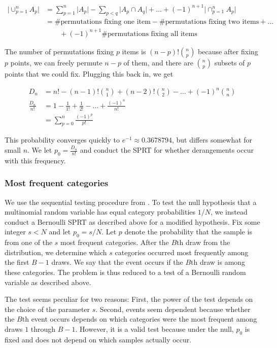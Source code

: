 \documentclass[12pt]{article}
\begin{document}
\begin{align*}
\lvert \cup_{p=1}^n A_p \rvert &= \sum_{p=1}^n \lvert A_p \rvert - \sum_{p < q} \lvert A_p \cap A_q \rvert + \dots + (-1)^{n+1}\lvert \cap_{p=1}^n A_p \rvert \\
&= \text{\# permutations fixing one item} - \text{\# permutations fixing two items} + \dots \\
& \qquad + (-1)^{n+1} \text{\# permutations fixing all items}
\end{align*}

The number of permutations fixing $p$ items is $(n-p)! {n \choose p}$ because after fixing $p$ points, we can freely permute $n-p$ of them, and there are ${n\choose p}$ subsets of $p$ points that we could fix. 
Plugging this back in, we get

\begin{align*}
D_n &= n! - (n-1)!{n \choose 1} + (n-2)!{n \choose 2} - \dots + (-1)^{n}{n \choose n} \\
\frac{D_n}{n!} &= 1 - \frac{1}{1!} + \frac{1}{2!} - \dots + \frac{(-1)^{n}}{n!} \\
&= \sum_{p=0}^n \frac{(-1)^{p}}{p!}
\end{align*}

This probability converges quickly to $e^{-1} \approx 0.3678794$, but differs somewhat for small $n$. 
We let $p_0 = \frac{D_n}{n!}$ and conduct the SPRT for whether derangements occur with this frequency.

\subsubsection{Most frequent categories}
We use the sequential testing procedure from \citet{weiss_sequential_1962}. 
To test the null hypothesis that a multinomial random variable has equal category probabilities $1/N$, we instead conduct a Bernoulli SPRT as described above for a modified hypothesis. 
Fix some integer $s<N$ and let $p_0 = s/N$. 
Let $p$ denote the probability that the sample is from one of the $s$ most frequent categories. 
After the $B$th draw from the distribution, we determine which $s$ categories occurred most frequently among the first $B-1$ draws. 
We say that the event occurs if the $B$th draw is among these categories.
The problem is thus reduced to a test of a Bernoulli random variable as described above.

The test seems peculiar for two reasons:
First, the power of the test depends on the choice of the parameter $s$.
Second, events seem dependent because whether the $B$th event occurs depends on which categories were the most frequent among draws $1$ through $B-1$.
However, it is a valid test because under the null, $p_0$ is fixed and does not depend on which samples actually occur.
\end{document}

